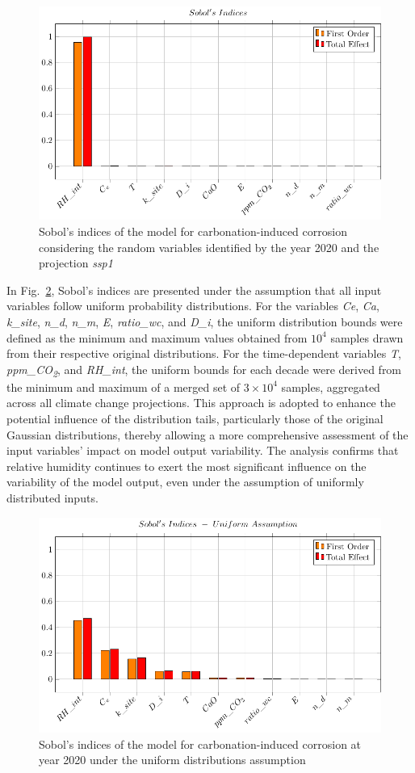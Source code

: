 \begin{figure}[H]
    \centering
    \includegraphics[width=0.8\linewidth]{imgs/pdfs/sobols_indices/carbonation/17_1_sobols_2020_ssp1.pdf}
    \caption{Sobol's indices of the model for carbonation-induced corrosion considering the random variables identified by the year 2020 and the projection \textit{ssp1}}\label{Sobol_carb_2020ssp1}
\end{figure}
In Fig.~\ref{Sobol_carb_2020uniform}, Sobol's indices are presented under the assumption that all input variables follow uniform probability distributions. For the variables \textit{Ce}, \textit{Ca}, \textit{k\_site}, \textit{n\_d}, \textit{n\_m}, \textit{E}, \textit{ratio\_wc}, and \textit{D\_i}, the uniform distribution bounds were defined as the minimum and maximum values obtained from $10^4$ samples drawn from their respective original distributions. For the time-dependent variables \textit{T}, \textit{ppm\_CO\textsubscript{2}}, and \textit{RH\_int}, the uniform bounds for each decade were derived from the minimum and maximum of a merged set of $3 \times 10^4$ samples, aggregated across all climate change projections. This approach is adopted to enhance the potential influence of the distribution tails, particularly those of the original Gaussian distributions, thereby allowing a more comprehensive assessment of the input variables' impact on model output variability. 
The analysis confirms that relative humidity continues to exert the most significant influence on the variability of the model output, even under the assumption of uniformly distributed inputs.
\begin{figure}[H]
    \centering
    \includegraphics[width=0.8\linewidth]{imgs/pdfs/sobols_indices/carbonation/16_1_sobols_uniform_2020.pdf}
    \caption{Sobol's indices of the model for carbonation-induced corrosion at year 2020 under the uniform distributions assumption}\label{Sobol_carb_2020uniform}
\end{figure}

